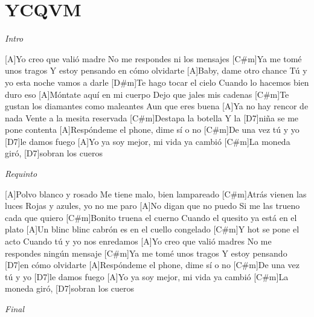 \section{YCQVM}

\noindent
\vspace{1cm}

\begin{guitar}
	\begin{multicols}{2}

	\textit{Intro}
	\par

	[A]Yo creo que valió madre
	No me respondes ni los mensajes
	[C#m]Ya me tomé unos tragos
	Y estoy pensando en cómo olvidarte
	[A]Baby, dame otro chance
	Tú y yo esta noche vamos a darle
	[D#m]Te hago tocar el cielo
	Cuando lo hacemos bien duro eso
	[A]Móntate aquí en mi cuerpo
	Dejo que jales mis cadenas
	[C#m]Te gustan los diamantes como maleantes
	Aun que eres buena
	[A]Ya no hay rencor de nada
	Vente a la mesita reservada
	[C#m]Destapa la botella
	Y la [D7]niña se me pone contenta
	[A]Respóndeme el phone, dime sí o no
	[C#m]De una vez tú y yo [D7]le damos fuego
	[A]Yo ya soy mejor, mi vida ya cambió
	[C#m]La moneda giró, [D7]sobran los cueros

	\textit{Requinto}

	[A]Polvo blanco y rosado
	Me tiene malo, bien lampareado
	[C#m]Atrás vienen las luces
	Rojas y azules, yo no me paro
	[A]No digan que no puedo
	Si me las trueno cada que quiero
	[C#m]Bonito truena el cuerno
	Cuando el quesito ya está en el plato
	[A]Un blinc blinc cabrón
	es en el cuello congelado
	[C#m]Y hot se pone el acto
	Cuando tú y yo nos enredamos
	[A]Yo creo que valió madres
	No me respondes ningún mensaje
	[C#m]Ya me tomé unos tragos
	Y estoy pensando [D7]en cómo olvidarte
	[A]Respóndeme el phone, dime sí o no
	[C#m]De una vez tú y yo [D7]le damos fuego
	[A]Yo ya soy mejor, mi vida ya cambió
	[C#m]La moneda giró, [D7]sobran los cueros


	\textit{Final}
\end{multicols}
\end{guitar}


